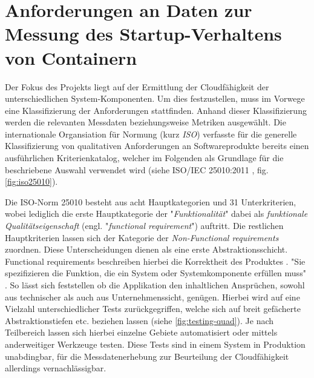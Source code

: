 \section{Anforderungen an Daten zur Messung des Startup-Verhaltens von Containern}
\label{sec:startupAnforderungen}


Der Fokus des Projekts liegt auf der Ermittlung der Cloudfähigkeit der unterschiedlichen System-Komponenten. Um dies festzustellen, muss im Vorwege eine Klassifizierung der Anforderungen stattfinden. Anhand dieser Klassifizierung werden die relevanten Messdaten beziehungsweise Metriken ausgewählt. Die internationale Organsiation für Normung (kurz \emph{ISO}) verfasste für die generelle Klassifizierung von qualitativen Anforderungen an Softwareprodukte bereits einen ausführlichen Kriterienkatalog, welcher im Folgenden als Grundlage für die beschriebene Auswahl verwendet wird (siehe ISO/IEC 25010:2011 \cite{iso25010}, fig. \ref{fig:iso25010}). 

Die ISO-Norm 25010 besteht aus acht Hauptkategorien und 31 Unterkriterien, wobei lediglich die erste Hauptkategorie der "\emph{Funktionalität}" dabei als \emph{funktionale Qualitätseigenschaft} (engl. "\emph{functional requirement}") auftritt. Die restlichen Hauptkriterien lassen sich der Kategorie der \emph{Non-Functional requirements} zuordnen. Diese Unterscheidungen dienen als eine erste Abstraktionsschicht. Functional requirements beschreiben hierbei die Korrektheit des Produktes \cite[Seite~335]{continuous-delivery}. "Sie spezifizieren die Funktion, die ein System oder Systemkomponente erfüllen muss" \cite[Seite~34]{eide-requirements}. So lässt sich feststellen ob die Applikation den inhaltlichen Ansprüchen, sowohl aus technischer als auch aus Unternehmenssicht, genügen. Hierbei wird auf eine Vielzahl unterschiedlicher Tests zurückgegriffen, welche sich auf breit gefächerte Abstraktionstiefen etc. beziehen lassen (siehe \ref{fig:testing-quad}). Je nach Teilbereich lassen sich hierbei einzelne Gebiete automatisiert oder mittels anderweitiger Werkzeuge testen. Diese Tests sind in einem System in Produktion unabdingbar, für die Messdatenerhebung zur Beurteilung der Cloudfähigkeit allerdings vernachlässigbar. 

